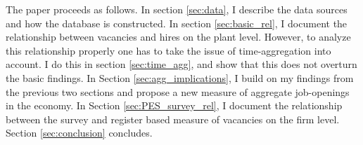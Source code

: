 The paper proceeds as follows. In section \ref{sec:data}, I describe the data sources and how the database is constructed. In section \ref{sec:basic_rel}, I document the relationship between vacancies and hires on the plant level. However, to analyze this relationship properly one has to take the issue of time-aggregation into account. I do this in section \ref{sec:time_agg}, and show that this does not overturn the basic findings. In Section \ref{sec:agg_implications}, I build on my findings from the previous two sections and propose a new measure of aggregate job-openings in the economy. In Section \ref{sec:PES_survey_rel}, I document the relationship between the survey and register based measure of vacancies on the firm level. Section \ref{sec:conclusion} concludes.